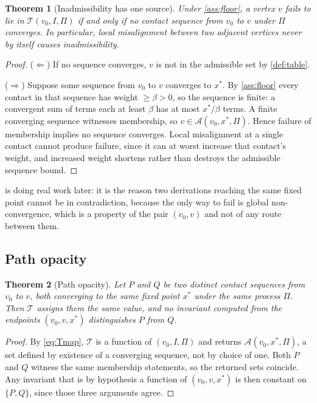 \documentclass[11pt,twocolumn,a4paper]{article}
\theoremstyle{plain}
\newtheorem{theorem}{Theorem}[section]
\theoremstyle{definition}
\theoremstyle{remark}
\newcommand{\Tmap}{\mathcal{T}}
\newcommand{\Adm}{\mathcal{A}}
\begin{document}
\begin{theorem}[Inadmissibility has one source]
\label{thm:admissibility}
Under \cref{ass:floor}, a vertex $v$ fails to lie in $\Tmap(v_0,I,\Pi)$ if and
only if no contact sequence from $v_0$ to $v$ under $\Pi$ converges. In
particular, local misalignment between two adjacent vertices never by itself
causes inadmissibility.
\end{theorem}

\begin{proof}
($\Leftarrow$) If no sequence converges, $v$ is not in the admissible set by
\cref{def:table}.

($\Rightarrow$) Suppose some sequence from $v_0$ to $v$ converges to $x^*$. By
\cref{ass:floor} every contact in that sequence has weight $\ge\beta > 0$, so
the sequence is finite: a convergent sum of terms each at least $\beta$ has at
most $x^*/\beta$ terms. A finite converging sequence witnesses membership, so
$v \in \Adm(v_0,x^*,\Pi)$. Hence failure of membership implies no sequence
converges. Local misalignment at a single contact cannot produce failure, since
it can at worst increase that contact's weight, and increased weight shortens
rather than destroys the admissible sequence bound.
\end{proof}

 is doing real work later: it is the reason two
derivations reaching the same fixed point cannot be in contradiction, because
the only way to fail is global non-convergence, which is a property of the pair
$(v_0,v)$ and not of any route between them.

\subsection{Path opacity}

\begin{theorem}[Path opacity]
\label{thm:opacity}
Let $P$ and $Q$ be two distinct contact sequences from $v_0$ to $v$, both
converging to the same fixed point $x^*$ under the same process $\Pi$. Then
$\Tmap$ assigns them the same value, and no invariant computed from the
endpoints $(v_0, v, x^*)$ distinguishes $P$ from $Q$.
\end{theorem}

\begin{proof}
By \cref{eq:Tmap}, $\Tmap$ is a function of $(v_0, I, \Pi)$ and returns
$\Adm(v_0,x^*,\Pi)$, a set defined by existence of a converging sequence, not by
choice of one. Both $P$ and $Q$ witness the same membership statements, so the
returned sets coincide. Any invariant that is by hypothesis a function of
$(v_0,v,x^*)$ is then constant on $\{P,Q\}$, since those three arguments agree.
\end{proof}
\end{document}
